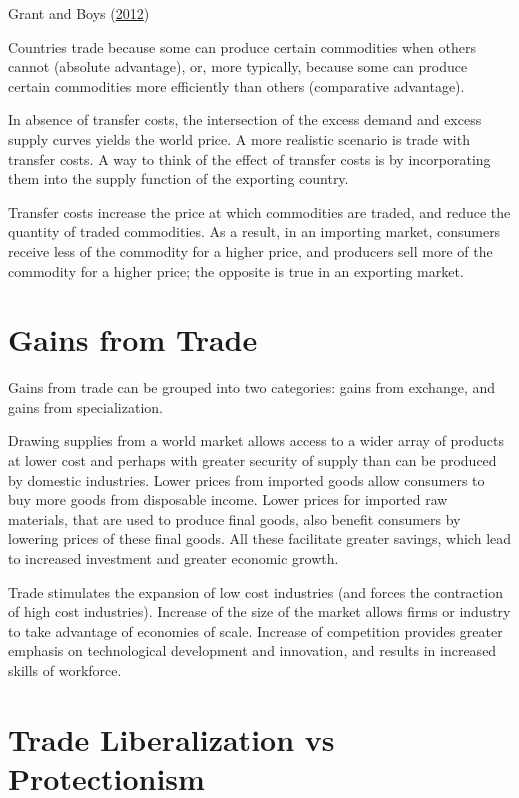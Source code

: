 \documentclass[
]{book}
\begin{document}
Grant and Boys (\protect\hyperlink{ref-grant2012}{2012})

Countries trade because some can produce certain commodities when others cannot (absolute advantage), or, more typically, because some can produce certain commodities more efficiently than others (comparative advantage).

In absence of transfer costs, the intersection of the excess demand and excess supply curves yields the world price. A more realistic scenario is trade with transfer costs. A way to think of the effect of transfer costs is by incorporating them into the supply function of the exporting country.

Transfer costs increase the price at which commodities are traded, and reduce the quantity of traded commodities. As a result, in an importing market, consumers receive less of the commodity for a higher price, and producers sell more of the commodity for a higher price; the opposite is true in an exporting market.

\hypertarget{gains-from-trade}{%
\section{Gains from Trade}\label{gains-from-trade}}

Gains from trade can be grouped into two categories: gains from exchange, and gains from specialization.

Drawing supplies from a world market allows access to a wider array of products at lower cost and perhaps with greater security of supply than can be produced by domestic industries. Lower prices from imported goods allow consumers to buy more goods from disposable income. Lower prices for imported raw materials, that are used to produce final goods, also benefit consumers by lowering prices of these final goods. All these facilitate greater savings, which lead to increased investment and greater economic growth.

Trade stimulates the expansion of low cost industries (and forces the contraction of high cost industries). Increase of the size of the market allows firms or industry to take advantage of economies of scale. Increase of competition provides greater emphasis on technological development and innovation, and results in increased skills of workforce.

\hypertarget{trade-liberalization-vs-protectionism}{%
\section{Trade Liberalization vs Protectionism}\label{trade-liberalization-vs-protectionism}}
\end{document}
